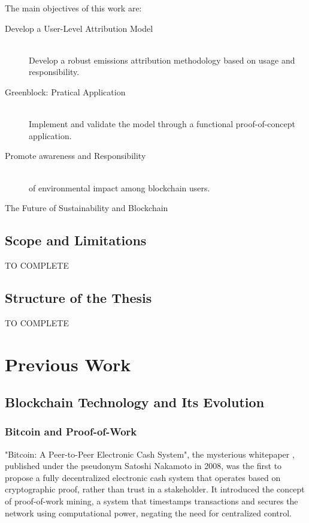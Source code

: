 \documentclass[11pt]{report}
\begin{document}
The main objectives of this work are:

\begin{description}

    \item [Develop a User-Level Attribution Model] \hfill \\
          Develop a robust emissions attribution methodology based on usage and responsibility.
    \item [Greenblock: Pratical Application] \hfill \\
          Implement and validate the model through a functional proof-of-concept application.
    \item [Promote awareness and Responsibility] \hfill \\
          of environmental impact among blockchain users.
    \item [The Future of Sustainability and Blockchain] 
\end{description}

\section{Scope and Limitations}
TO COMPLETE


\section{Structure of the Thesis}
TO COMPLETE

\chapter{Previous Work} \label{ch:previous_work}


\section{Blockchain Technology and Its Evolution}
\subsection{Bitcoin and Proof-of-Work}
"Bitcoin: A Peer-to-Peer Electronic Cash System", the mysterious whitepaper \cite{nakamotoBitcoinPeertopeerElectronic2008}, published under the pseudonym Satoshi Nakamoto in 2008, was the first to propose a fully decentralized electronic cash system that operates based on cryptographic proof, rather than trust in a stakeholder. It introduced the concept of proof-of-work mining, a system that timestamps transactions and secures the network using computational power, negating the need for centralized control.
\end{document}
